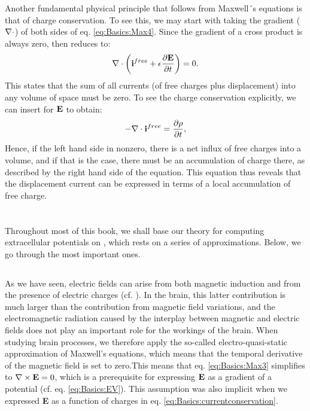 Another fundamental physical principle that follows from Maxwell´s equations is that of charge conservation. To see this, we may start with taking the gradient (${\bf \nabla} \cdot$) of both sides of eq. \ref{eq:Basics:Max4}. Since the gradient of a cross product is always zero,  then reduces to:
\begin{equation}
{\bf \nabla} \cdot \left( {\bf i}^{free} +  \epsilon \frac{\partial {\bf E}}{\partial t} \right) = 0.
\label{eq:Basics:Max4dot}
\end{equation}
This states that the sum of all currents (of free charges plus displacement) into any volume of space must be zero. To see the charge conservation explicitly, we can insert  for ${\bf E}$ to obtain:
\begin{equation}
- {\bf \nabla} \cdot {\bf i}^{free} =  \frac{\partial \rho}{\partial t},
\label{eq:Basics:currentconservation}
\end{equation}
Hence, if the left hand side in nonzero, there is a net influx of free charges into a volume, and if that is the case, there must be an accumulation of charge there, as described by the right hand side of the equation. This equation thus reveals that the displacement current can be expressed in terms of a local accumulation of free charge.


\section{}
Throughout most of this book, we shall base our theory for computing extracellular potentials on , which rests on a series of approximations. Below, we go through the most important ones. 


\subsection{}
\label{sec:Basics:Quasielectrostatic} 
As we have seen, electric fields can arise from both magnetic induction and from the presence of electric charges (cf. ). In the brain, this latter contribution is much larger than the contribution from magnetic field variations, and the electromagnetic radiation caused by the interplay between magnetic and electric fields does not play an important role for the workings of the brain. When studying brain processes, we therefore apply the so-called electro-quasi-static approximation of Maxwell's equations, which means that the temporal derivative of the magnetic field is set to zero.This means that eq. \ref{eq:Basics:Max3} simplifies to ${\bf \nabla} \times {\bf E} = 0$, which is a prerequisite for expressing ${\bf E}$ as a gradient of a potential (cf. eq. \ref{eq:Basics:EV}). This assumption was also implicit when we expressed {\bf E} as a function of charges in eq. \ref{eq:Basics:currentconservation}. 


